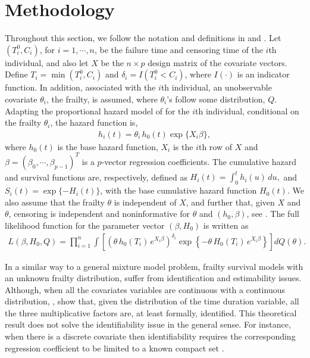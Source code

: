 \documentclass[graybox]{svmult}
\begin{document}
\section{Methodology}\label{Methodology}
Throughout this section, we follow the notation and definitions in \cite{Lawless1981} and \cite{Gorfine2006}.
Let $(T^0_{i},C_{i})$, for $i=1,\cdots,n$, be the failure time and censoring time of the $i$th individual,
and also let $X$ be the $n\times p$ design matrix of the covariate vectors. Define $T_i = \min(T^0_{i},C_i)$
and $\delta_i=I(T^0_{i} < C_i)$, where $I(\cdot)$ is an indicator function. In addition, associated with the $i$th
individual, an unobservable covariate $\theta_i$, the frailty, is assumed, where $\theta_i$'s follow some
distribution, $Q$.
Adapting the proportional hazard model of \cite{Cox1972} for the $i$th individual, conditional on the frailty $\theta_i$,
the hazard function is, 
\begin{eqnarray}
h_i(t)=\theta_i\, h_0(t) \exp\{X_i\beta \},\label{Exp_hazard}
\end{eqnarray}
where $h_0(t)$ is the base hazard function, $X_i$ is the $i$th row of $X$ and $\beta=(\beta_0,\cdots,\beta_{p-1})^T$
is a $p$-vector regression coefficients. The cumulative hazard  and survival functions are, respectively, defined as
$
H_i(t)=\int_{0}^{t}{h_i(u)\,du},$ and  $S_i(t)=\exp\{-H_i(t)\}$,
with the base cumulative hazard function $H_0(t)$. We also assume that the frailty $\theta$ is independent
of $X$, and further that, given $X$ and $\theta$, censoring is independent and noninformative for $\theta$
and $(h_0,\beta)$, see \cite{Gorfine2006}. The full likelihood function for the parameter vector $(\beta, H_0)$ is written as
\begin{eqnarray}
 L(\beta,H_0,Q)={\prod_{i=1}^{n}  \int \left[\left(\theta\, h_0(T_i)\, e^{X_i \beta}\right)^{\delta_i} \exp \left\{-\theta\,H_0(T_i)\, e^{X_i \beta}\right\}\right] dQ(\theta)  }.\label{likelihood_frailty} 
\end{eqnarray}


In a similar way to a general mixture model problem,  frailty survival
models with an unknown frailty distribution, suffer from identification and estimability  issues. Although, when all the covariates
variables are continuous with a continuous distribution, \cite{Eleber1982}, show that, given the distribution
of the time duration variable, all the three multiplicative factors are, at least formally, identified. This theoretical result does
not solve the identifiability issue in the general sense. For instance, when there is a discrete covariate
then identifiability requires the corresponding regression coefficient to be limited to a known compact set
\cite[Ch.2]{Horowitz2010}. 
\end{document}
